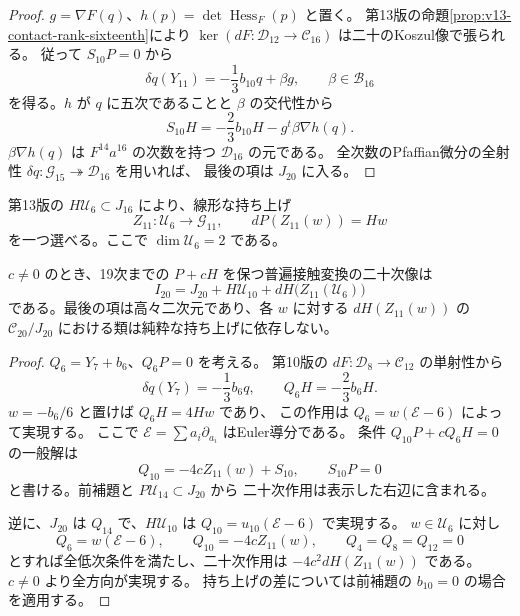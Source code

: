 \begin{proof}
$g=\nabla F(q)$、$h(p)=\det\operatorname{Hess}_F(p)$ と置く。
第13版の命題\ref{prop:v13-contact-rank-sixteenth}により
$\ker(dF:\mathcal D_{12}\to\mathcal C_{16})$ は二十のKoszul像で張られる。
従って $S_{10}P=0$ から
\[
 \delta q(Y_{11})=-\frac13b_{10}q+\beta g,
 \qquad \beta\in\mathcal B_{16}
\]
を得る。$h$ が $q$ に五次であることと $\beta$ の交代性から
\[
 S_{10}H=-\frac23b_{10}H-g^t\beta\nabla h(q).
\]
$\beta\nabla h(q)$ は $F^{14}a^{16}$ の次数を持つ
$\mathcal D_{16}$ の元である。
全次数のPfaffian微分の全射性
$\delta q:\mathcal G_{15}\twoheadrightarrow\mathcal D_{16}$ を用いれば、
最後の項は $J_{20}$ に入る。
\end{proof}

第13版の $H\mathcal U_6\subset J_{16}$ により、線形な持ち上げ
\[
 Z_{11}:\mathcal U_6\longrightarrow\mathcal G_{11},\qquad
 dP(Z_{11}(w))=Hw
\]
を一つ選べる。ここで $\dim\mathcal U_6=2$ である。

\begin{theorem}[二十次の有効像の有限縮約]
\label{thm:v15-effective-twentieth}
$c\ne0$ のとき、19次までの $P+cH$ を保つ普遍接触変換の二十次像は
\begin{equation}\label{eq:v15-effective-image}
 I_{20}=J_{20}+H\mathcal U_{10}
             +dH\bigl(Z_{11}(\mathcal U_6)\bigr)
\end{equation}
である。最後の項は高々二次元であり、各 $w$ に対する
$dH(Z_{11}(w))$ の $\mathcal C_{20}/J_{20}$ における類は純粋な持ち上げに依存しない。
\end{theorem}

\begin{proof}
$Q_6=Y_7+b_6$、$Q_6P=0$ を考える。
第10版の $dF:\mathcal D_8\to\mathcal C_{12}$ の単射性から
\[
 \delta q(Y_7)=-\frac13b_6q,\qquad Q_6H=-\frac23b_6H.
\]
$w=-b_6/6$ と置けば $Q_6H=4Hw$ であり、
この作用は $Q_6=w(\mathcal E-6)$ によって実現する。
ここで $\mathcal E=\sum a_i\partial_{a_i}$ はEuler導分である。
条件 $Q_{10}P+cQ_6H=0$ の一般解は
\[
 Q_{10}=-4cZ_{11}(w)+S_{10},\qquad S_{10}P=0
\]
と書ける。前補題と $P\mathcal U_{14}\subset J_{20}$ から
二十次作用は表示した右辺に含まれる。

逆に、$J_{20}$ は $Q_{14}$ で、$H\mathcal U_{10}$ は
$Q_{10}=u_{10}(\mathcal E-6)$ で実現する。
$w\in\mathcal U_6$ に対し
\[
 Q_6=w(\mathcal E-6),\qquad Q_{10}=-4cZ_{11}(w),
 \qquad Q_4=Q_8=Q_{12}=0
\]
とすれば全低次条件を満たし、二十次作用は $-4c^2dH(Z_{11}(w))$ である。
$c\ne0$ より全方向が実現する。
持ち上げの差については前補題の $b_{10}=0$ の場合を適用する。
\end{proof}

